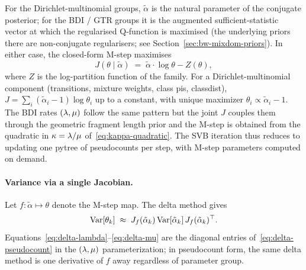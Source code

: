 For the Dirichlet-multinomial groups, $\tilde{\alpha}$ is the natural
parameter of the conjugate posterior; for the BDI / GTR groups it is
the augmented sufficient-statistic vector at which the regularised
Q-function is maximised (the underlying priors there are non-conjugate
regularisers\ifdefined\MIXDOMPAPER ; see Section~\ref{sec:bw-mixdom-priors}\fi).  In either
case, the closed-form M-step maximises
\begin{equation}\label{eq:pseudocount-mstep}
  J(\theta \mid \tilde{\alpha}) \;=\; \tilde{\alpha} \cdot \log \theta - Z(\theta),
\end{equation}
where $Z$ is the log-partition function of the family.  For a
Dirichlet-multinomial component (transitions, mixture weights,
class pis, classdist), $J = \sum_i (\tilde{\alpha}_i - 1)\log \theta_i$
up to a constant, with unique maximizer $\theta_i \propto \tilde{\alpha}_i - 1$.
The BDI rates $(\lambda,\mu)$ follow the same pattern but the
joint $J$ couples them through the geometric fragment length prior
and the M-step is obtained from the quadratic in $\kappa = \lambda/\mu$
of~\eqref{eq:kappa-quadratic}.  The SVB iteration thus reduces to
updating one pytree of pseudocounts per step, with M-step parameters
computed on demand.

\paragraph{Variance via a single Jacobian.}
Let $f\colon \tilde{\alpha}\mapsto\theta$ denote the M-step map.  The
delta method gives
\begin{equation}\label{eq:delta-pseudocount}
  \mathrm{Var}[\theta_k]
  \;\approx\; J_f(\tilde{\alpha}_k)\,\mathrm{Var}[\tilde{\alpha}_k]\,J_f(\tilde{\alpha}_k)^\top.
\end{equation}
Equations~\eqref{eq:delta-lambda}--\eqref{eq:delta-mu} are the diagonal
entries of~\eqref{eq:delta-pseudocount} in the $(\lambda,\mu)$
parameterization; in pseudocount form, the same delta method is one
derivative of $f$ away regardless of parameter group.


